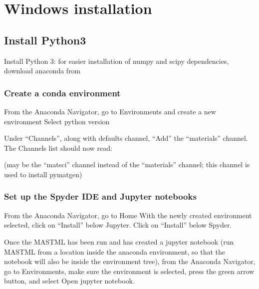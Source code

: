 \documentclass[letterpaper,10pt,english]{sphinxmanual}
\begin{document}
\section{Windows installation}
\label{\detokenize{0_2_windows_installation:windows-installation}}\label{\detokenize{0_2_windows_installation::doc}}

\subsection{Install Python3}
\label{\detokenize{0_2_windows_installation:install-python3}}
Install Python 3: for easier installation of numpy and scipy dependencies,
download anaconda from 


\subsubsection{Create a conda environment}
\label{\detokenize{0_2_windows_installation:create-a-conda-environment}}
From the Anaconda Navigator, go to Environments and create a new environment
Select python version 

Under “Channels”, along with defaults channel, “Add” the “materials” channel.
The Channels list should now read:

\begin{sphinxVerbatim}[commandchars=\\\{\}]
\end{sphinxVerbatim}

(may be the “matsci” channel instead of the “materials” channel;
this channel is used to install pymatgen)


\subsubsection{Set up the Spyder IDE and Jupyter notebooks}
\label{\detokenize{0_2_windows_installation:set-up-the-spyder-ide-and-jupyter-notebooks}}
From the Anaconda Navigator, go to Home
With the newly created environment selected, click on “Install” below Jupyter.
Click on “Install” below Spyder.

Once the MASTML has been run and has created a jupyter notebook (run MASTML
from a location inside the anaconda environment, so that the notebook will
also be inside the environment tree), from the Anaconda Navigator, go to
Environments, make sure the environment is selected, press the green arrow
button, and select Open jupyter notebook.
\end{document}
